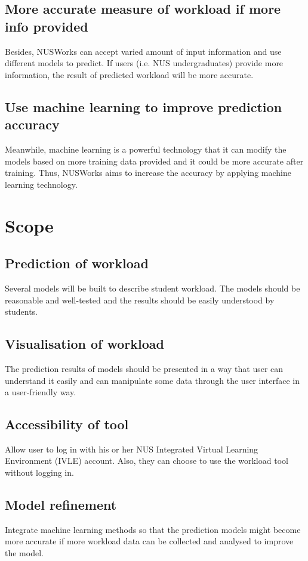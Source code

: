 \documentclass[fyp]{socreport}
\begin{document}
\subsection{More accurate measure of workload if more info provided}
Besides, NUSWorks can accept varied amount of input information and use different models to predict. If users (i.e. NUS undergraduates) provide more information, the result of predicted workload will be more accurate.

\subsection{Use machine learning to improve prediction accuracy}
Meanwhile, machine learning is a powerful technology that it can modify the models based on more training data provided and it could be more accurate after training. Thus, NUSWorks aims to increase the accuracy by applying machine learning technology.

\section{Scope}
\subsection{Prediction of workload}
Several models will be built to describe student workload. The models should be reasonable and well-tested and the results should be easily understood by students.

\subsection{Visualisation of workload}
The prediction results of models should be presented in a way that user can understand it easily and can manipulate some data through the user interface in a user-friendly way.

\subsection{Accessibility of tool}
Allow user to log in with his or her NUS Integrated Virtual Learning Environment (IVLE) account. Also, they can choose to use the workload tool without logging in.

\subsection{Model refinement}
Integrate machine learning methods so that the prediction models might become more accurate if more workload data can be collected and analysed to improve the model.
\end{document}
